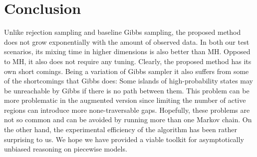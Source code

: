 \section{Conclusion}
Unlike rejection sampling and baseline Gibbs sampling, the proposed method does not grow exponentially with the amount of observed data.
In both our test scenarios, its mixing time in higher dimensions is also better than MH.
Opposed to MH, it also does not require any tuning.
Clearly, the proposed method has its own short comings.
Being a variation of Gibbs sampler it also suffers from some of the shortcomings that Gibbs does:
Some islands of high-probability states may be unreachable by Gibbs if there is no path between them.
This problem can be more problematic in the augmented version since limiting the number of active regions can introduce more none-traversable gaps. 
Hopefully, these problems are not so common and can be avoided by running more than one Markov chain. 
On the other hand, the experimental efficiency of the algorithm has been rather surprising to us.
We hope we have provided a viable toolkit for asymptotically unbiased reasoning on piecewise models.